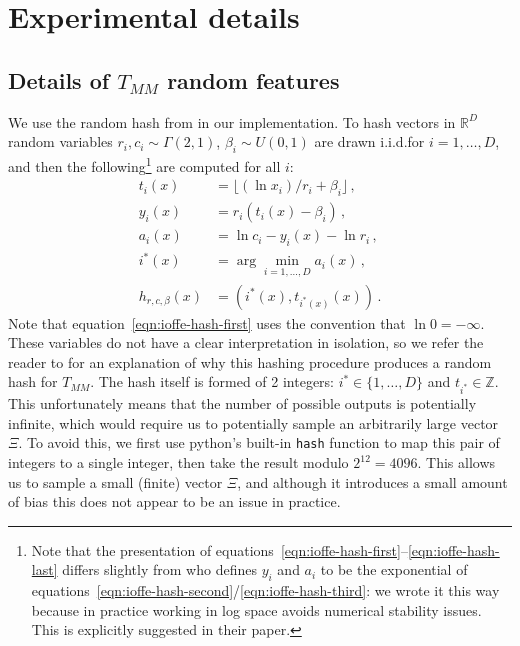 \section{Experimental details}\label{trf:appendix:experimental details}

\subsection{Details of \texorpdfstring{$T_{MM}$}{TMM} random features}\label{apdx:explain tmm features and hash}

We use the random hash from \citet{ioffe2010improved} in our implementation.
To hash vectors in $\mathbb{R}^D$
random variables
$r_i, c_i\sim \Gamma(2, 1)$, $\beta_i\sim U(0, 1)$
are drawn i.i.d.\@ for $i=1,\ldots,D$,
and then the following\footnote{
Note that the presentation of equations~\ref{eqn:ioffe-hash-first}--\ref{eqn:ioffe-hash-last}
differs slightly from \citet{ioffe2010improved} who defines $y_i$ and $a_i$ to be the exponential
of equations~\ref{eqn:ioffe-hash-second}/\ref{eqn:ioffe-hash-third}: we wrote it this way because in practice
working in log space avoids numerical stability issues.
This is explicitly suggested in their paper.
}
are computed for all $i$:
\begin{align}
    t_i(x) &= \lfloor (\ln{x_i})/r_i + \beta_i \rfloor \label{eqn:ioffe-hash-first}\,, \\
    y_i(x) &= r_i(t_i(x)-\beta_i) \label{eqn:ioffe-hash-second}\,, \\
    a_i(x) &= \ln{c_i} - y_i(x) - \ln{r_i} \label{eqn:ioffe-hash-third}\,, \\
    i^*(x) &= \arg\min_{i=1,\ldots,D} a_i(x)\,,  \\
    h_{r,c,\beta}(x) &= \left(i^*(x), t_{i^*(x)}(x)\right) \,.\label{eqn:ioffe-hash-last}
\end{align}
Note that equation~\ref{eqn:ioffe-hash-first} uses the convention that $\ln{0}=-\infty$.
These variables do not have a clear interpretation in isolation, so we refer the reader
to \citet{ioffe2010improved} for an explanation of why this hashing procedure
produces a random hash for $T_{MM}$.
The hash itself is formed of 2 integers: $i^*\in\{1,\ldots,D\}$
and $t_{i^*}\in\mathbb{Z}$.
This unfortunately means that the number of possible outputs is potentially infinite,
which would require us to potentially sample an arbitrarily large vector $\Xi$.
To avoid this, we first use python's built-in \texttt{hash} function to map this pair of integers to a single integer,
then take the result modulo $2^{12}=4096$.
This allows us to sample a small (finite) vector $\Xi$,
and although it introduces a small amount of bias this does not appear to be an issue in practice.

